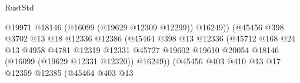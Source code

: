 \begin{lexlean}{RustStd}
\begin{coremodule}
                                                          @19971
                                                          @18146
                                                          (@16099 (@19629 @12309 @12299))
                                                          @16249))
                                                      (@45456
                                                        @398
                                                        @3702
                                                        @13
                                                        @18
                                                        @12336
                                                        @12386
                                                        (@45464
                                                          @398
                                                          @13
                                                          @12336
                                                          (@45712
                                                            @168
                                                            @24
                                                            @13
                                                            @4958
                                                            @4781
                                                            @12319
                                                            @12331
                                                            @45727
                                                            @19602
                                                            @19610
                                                            @20054
                                                            @18146
                                                            (@16099 (@19629 @12331 @12320))
                                                            @16249))
                                                        (@45456
                                                          @403
                                                          @410
                                                          @13
                                                          @17
                                                          @12359
                                                          @12385
                                                          (@45464
                                                            @403
                                                            @13

\end{coremodule}
\end{lexlean}
